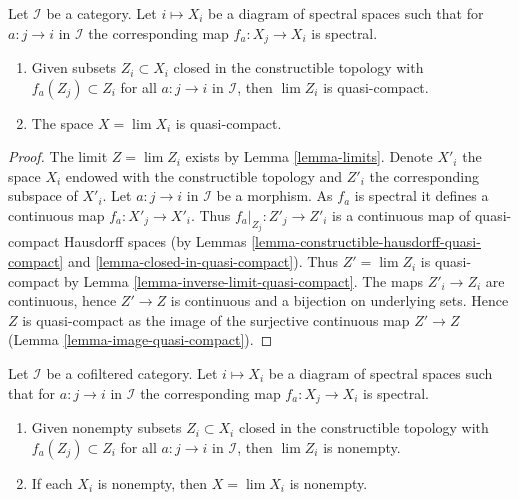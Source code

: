 \begin{lemma}
\label{lemma-inverse-limit-spectral-spaces-quasi-compact}
Let $\mathcal{I}$ be a category. Let $i \mapsto X_i$ be a diagram
of spectral spaces such that for $a : j \to i$ in $\mathcal{I}$
the corresponding map $f_a : X_j \to X_i$ is spectral.
\begin{enumerate}
\item Given subsets $Z_i \subset X_i$ closed in the constructible
topology with $f_a(Z_j) \subset Z_i$ for all $a : j \to i$ in $\mathcal{I}$,
then $\lim Z_i$ is quasi-compact.
\item The space $X = \lim X_i$ is quasi-compact.
\end{enumerate}
\end{lemma}

\begin{proof}
The limit $Z = \lim Z_i$ exists by Lemma \ref{lemma-limits}.
Denote $X'_i$ the space $X_i$ endowed with the constructible topology
and $Z'_i$ the corresponding subspace of $X'_i$.
Let $a : j \to i$ in $\mathcal{I}$ be a morphism. As $f_a$ is spectral
it defines a continuous map $f_a : X'_j \to X'_i$. Thus
$f_a|_{Z_j} : Z'_j \to Z'_i$ is a continuous map of quasi-compact
Hausdorff spaces (by
Lemmas \ref{lemma-constructible-hausdorff-quasi-compact} and
\ref{lemma-closed-in-quasi-compact}).
Thus $Z' = \lim Z_i$ is quasi-compact by
Lemma \ref{lemma-inverse-limit-quasi-compact}.
The maps $Z'_i \to Z_i$ are continuous, hence $Z' \to Z$
is continuous and a bijection on underlying sets. Hence $Z$
is quasi-compact as the image of the surjective continuous map $Z' \to Z$
(Lemma \ref{lemma-image-quasi-compact}).
\end{proof}

\begin{lemma}
\label{lemma-inverse-limit-spectral-spaces-nonempty}
Let $\mathcal{I}$ be a cofiltered category. Let $i \mapsto X_i$ be a diagram
of spectral spaces such that for $a : j \to i$ in $\mathcal{I}$
the corresponding map $f_a : X_j \to X_i$ is spectral.
\begin{enumerate}
\item Given nonempty subsets $Z_i \subset X_i$ closed in the constructible
topology with $f_a(Z_j) \subset Z_i$ for all $a : j \to i$ in $\mathcal{I}$,
then $\lim Z_i$ is nonempty.
\item If each $X_i$ is nonempty, then $X = \lim X_i$ is nonempty.
\end{enumerate}
\end{lemma}

